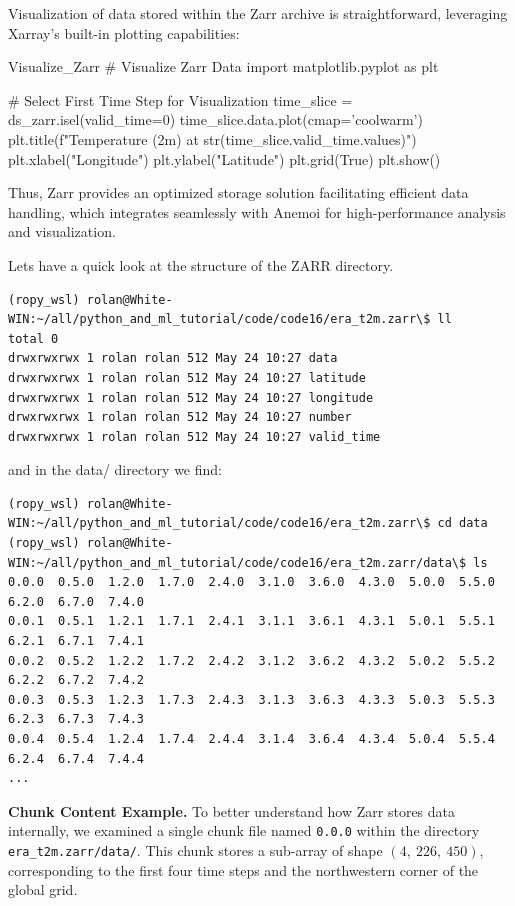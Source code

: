 %
Visualization of data stored within the Zarr archive is straightforward, leveraging Xarray's built-in plotting capabilities:

\begin{codeonly}{Visualize\_Zarr}
# Visualize Zarr Data
import matplotlib.pyplot as plt

# Select First Time Step for Visualization
time_slice = ds_zarr.isel(valid_time=0)
time_slice.data.plot(cmap='coolwarm')
plt.title(f"Temperature (2m) at {str(time_slice.valid_time.values)}")
plt.xlabel("Longitude")
plt.ylabel("Latitude")
plt.grid(True)
plt.show()
\end{codeonly}

Thus, Zarr provides an optimized storage solution facilitating efficient data handling, which integrates seamlessly with Anemoi for high-performance analysis and visualization.

Lets have a quick look at the structure of the ZARR directory. 

\begin{lstlisting}
(ropy_wsl) rolan@White-WIN:~/all/python_and_ml_tutorial/code/code16/era_t2m.zarr\$ ll
total 0
drwxrwxrwx 1 rolan rolan 512 May 24 10:27 data
drwxrwxrwx 1 rolan rolan 512 May 24 10:27 latitude
drwxrwxrwx 1 rolan rolan 512 May 24 10:27 longitude
drwxrwxrwx 1 rolan rolan 512 May 24 10:27 number
drwxrwxrwx 1 rolan rolan 512 May 24 10:27 valid_time
\end{lstlisting}

and in the data/ directory we find: 
\begin{lstlisting}
(ropy_wsl) rolan@White-WIN:~/all/python_and_ml_tutorial/code/code16/era_t2m.zarr\$ cd data
(ropy_wsl) rolan@White-WIN:~/all/python_and_ml_tutorial/code/code16/era_t2m.zarr/data\$ ls
0.0.0  0.5.0  1.2.0  1.7.0  2.4.0  3.1.0  3.6.0  4.3.0  5.0.0  5.5.0  6.2.0  6.7.0  7.4.0
0.0.1  0.5.1  1.2.1  1.7.1  2.4.1  3.1.1  3.6.1  4.3.1  5.0.1  5.5.1  6.2.1  6.7.1  7.4.1
0.0.2  0.5.2  1.2.2  1.7.2  2.4.2  3.1.2  3.6.2  4.3.2  5.0.2  5.5.2  6.2.2  6.7.2  7.4.2
0.0.3  0.5.3  1.2.3  1.7.3  2.4.3  3.1.3  3.6.3  4.3.3  5.0.3  5.5.3  6.2.3  6.7.3  7.4.3
0.0.4  0.5.4  1.2.4  1.7.4  2.4.4  3.1.4  3.6.4  4.3.4  5.0.4  5.5.4  6.2.4  6.7.4  7.4.4
...
\end{lstlisting}

{\bf Chunk Content Example.} To better understand how Zarr stores data internally, we examined a single chunk file named \texttt{0.0.0} within the directory \texttt{era\_t2m.zarr/data/}. This chunk stores a sub-array of shape $(4,\ 226,\ 450)$, corresponding to the first four time steps and the northwestern corner of the global grid.

